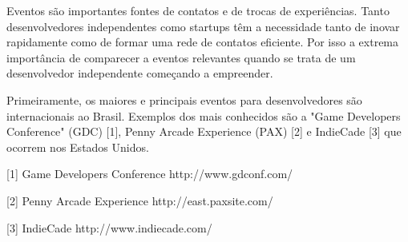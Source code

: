 Eventos são importantes fontes de contatos e de trocas de experiências. Tanto desenvolvedores independentes como startups têm a necessidade tanto de inovar rapidamente como de formar uma rede de contatos eficiente. Por isso a extrema importância de comparecer a eventos relevantes quando se trata de um desenvolvedor independente começando a empreender.

Primeiramente, os maiores e principais eventos para desenvolvedores são internacionais ao Brasil. Exemplos dos mais conhecidos são a "Game Developers Conference" (GDC) [1], Penny Arcade Experience (PAX) [2] e IndieCade [3] que ocorrem nos Estados Unidos.


[1] Game Developers Conference
http://www.gdconf.com/

[2] Penny Arcade Experience
http://east.paxsite.com/

[3] IndieCade
http://www.indiecade.com/
